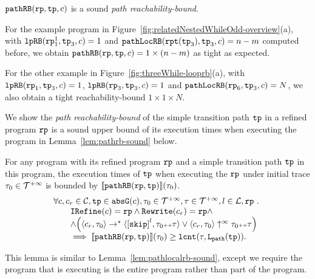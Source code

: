 $\mathtt{pathRB}(\mathtt{rp}, \mathtt{tp}, c)$ is a sound \emph{path reachability-bound}.
%

For the example program in Figure~\ref{fig:relatedNestedWhileOdd-overview}(a),
with $\mathtt{lpRB}(\mathtt{rp}_1^1, \mathtt{tp}_3, c) = 1$ and
$\mathtt{pathLocRB}(\mathtt{rpt}(\mathtt{tp}_3), \mathtt{tp}_3, c) = n - m$ computed before,
we obtain $\mathtt{pathRB}(\mathtt{rp}, \mathtt{tp}, c) = 1 \times (n - m)$ as tight as expected.

For the other example in Figure~\ref{fig:threeWhile-looprb}(a), with $\mathtt{lpRB}(\mathtt{rp}_1, \mathtt{tp}_3, c) = 1$,
$\mathtt{lpRB}(\mathtt{rp}_3, \mathtt{tp}_3, c) = 1$ and
$\mathtt{pathLocRB}(\mathtt{rp}_6, \mathtt{tp}_3, c) = N$,
we also obtain a tight reachability-bound $1 \times 1 \times N$.


We show the \emph{path reachability-bound} of the simple transition path $\mathtt{tp}$ in a refined program $\mathtt{rp}$ is a sound upper bound of its execution times when executing the program in Lemma~\ref{lem:pathrb-sound} below.
\begin{lem}
  \label{lem:pathrb-sound}
  For any program with its refined program $\mathtt{rp}$ and a simple transition path $\mathtt{tp}$ in this program,
  the execution times of $\mathtt{tp}$ when executing the $\mathtt{rp}$ under initial trace $\mathtt{\tau}_0 \in \mathcal{T}^{+\infty}$ is bounded by $\llbracket \mathtt{pathRB}(\mathtt{rp}, \mathtt{tp}) \rrbracket(\mathtt{\tau}_0)$.
  \[
    \begin{array}{l}
    \forall c, c_r \in \cdom, \tpath \in \absG(c), \trace_0 \in \tdom, \trace \in \tdom, l \in \ldom, \rprog \st 
    \\ \qquad
    \kw{IRefine}(c) = \rprog
    \land 
    \algrewrite(c_r) = \rprog
    \land
    \\ \qquad
    \land 
    \Big(
      \config{c_r, \trace_0} \rightarrow^* \config{\clabel{\eskip}^{l}, \trace_0 \tracecat \trace}
      \lor \config{c_r, \trace_0} \uparrow^{\infty} \trace_0 \tracecat \trace 
      \Big)
  \\ \qquad
    \implies
    \econfig{\inoutB(\rprog, \tpath)}(\trace_0) \geq \lcounter(\trace, \pathl(\tpath)).
    \end{array}
  \]  
\end{lem}
This lemma is similar to Lemma~\ref{lem:pathlocalrb-sound}, except we require the program that is executing is the entire program rather than part of the program.